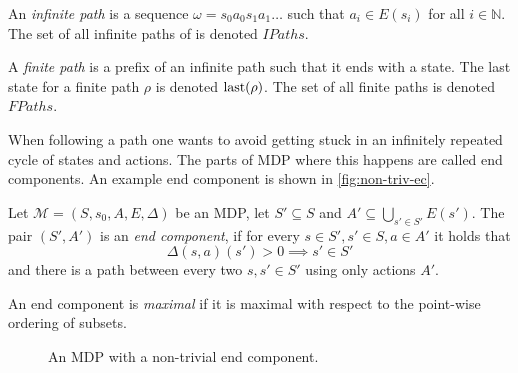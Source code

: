 \begin{definition}[Path]
    An {\em infinite path} is
    a sequence $\omega = s_0 a_0 s_1 a_1
    \ldots$ such that $a_i \in E(s_i)$ for all $i \in \mathbb{N}$.
    The set of all infinite paths of is denoted $IPaths$.

    A {\em finite path} is a prefix of an infinite path such that it
    ends with a state. The last state for a finite path $\rho$ is
    denoted $\operatorname{last}(\rho)$. The set of all finite paths is denoted
    $FPaths$.
\end{definition}

When following a path one wants to avoid getting stuck in
an infinitely repeated cycle of states and actions. The parts of MDP
where this happens are called end components.
An example end component is shown in \autoref{fig:non-triv-ec}.

\begin{definition}
Let $\mathcal{M} = (S, s_0, A, E, \Delta)$ be an MDP,
let $S' \subseteq S$ and $A' \subseteq \bigcup_{s' \in S'} E(s')$.
The pair $(S', A')$ is an {\em end component},
if for every $s \in S', s' \in S, a \in A'$ it holds that
$$\Delta(s,a)(s') > 0 \implies s' \in S'$$
and there is a path between every two $s, s' \in S'$
using only actions $A'$.

An end component is {\em maximal} if it is maximal with respect to
the point-wise ordering of subsets.
\end{definition}

\begin{figure}[ht]
\begin{center}
\end{center}
\caption{An MDP with a non-trivial end component.}
\label{fig:non-triv-ec}
\end{figure}

